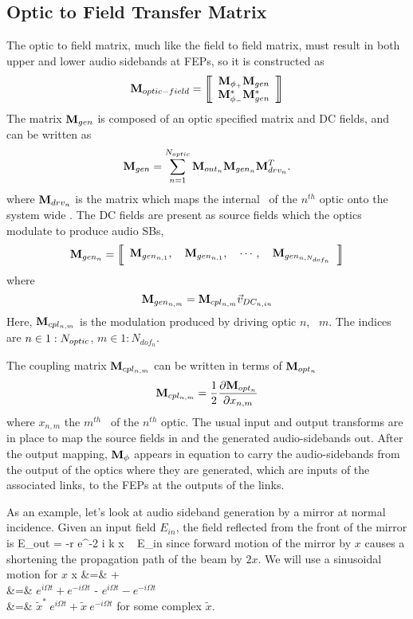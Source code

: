 \documentclass[12pt]{article}
\begin{document}
\subsection{Optic to Field Transfer Matrix}
The optic to field matrix, much like the field to field matrix, must result in both upper and lower audio sidebands at FEPs, so it is constructed as
\begin{equation}
\matm{optic-field} =
\matrixBegin{c}
 \mPhin{+} \mGen \\
 \mPhin{-}^* \mGen^* \\
\matrixEnd
\elabel{mOF}
\end{equation}
The matrix $\mathbf{M}_{gen}$ is composed of an optic specified matrix and DC fields, and can be written as
\begin{equation}
\mathbf{M}_{gen} = \sum_{n=1}^{N_{optic}} {\mathbf{M}_{out_{n}} \mathbf{M}_{gen_{n}} \mathbf{M}_{drv_{n}}^{T}}.
\end{equation}
where $\mathbf{M}_{drv_{n}}$ is the matrix which maps the internal \dsf\ of the $n^{th}$ optic onto the system wide \dsf. The DC fields are present as source fields which the optics modulate to produce audio SBs,
\begin{equation}
\mGenn{n} = \matrixBegin{c}
\mGenn{n,1} , ~~~
\mGenn{n,1} , ~~~
\cdots , ~~~
\mGenn{n,N_{dof_n}}
\matrixEnd \elabel{mGen}
\end{equation}
where
\begin{equation}
\mathbf{M}_{gen_{n,m}} = \mathbf{M}_{cpl_{n,m}} \vec{v}_{DC_{n,in}}
\end{equation}
Here, $\mathbf{M}_{cpl_{n,m}}$ is the modulation produced by driving optic $n$, \dof\ $m$.
The indices are $n \in 1:N_{optic}$, $m \in 1:N_{dof_n}$.

The coupling matrix $\mathbf{M}_{cpl_{n,m}}$ can be written in terms of $\mathbf{M}_{opt_{n}}$
\begin{equation}
\mCpln{n,m} = \frac{1}{2} \partderiv{\mOptn{n}}{x_{n,m}}
\elabel{mDrv}
\end{equation}
where $x_{n,m}$ the $m^{th}$ \dof\ of the $n^{th}$ optic. The usual input and output transforms are in place to map the source fields in and the generated audio-sidebands out.
After the output mapping, $\mathbf{M}_{\phi}$ appears in equation  to carry the audio-sidebands from the output of the optics where they are generated, which are inputs of the associated links, to the FEPs at the outputs of the links.

As an example, let's look at audio sideband generation by a mirror at normal incidence.
Given an input field $E_{in}$, the field reflected from the front of the mirror is
E_{out} = -r e^{-2 i k x} ~ E_{in}
\eeq
 since forward motion of the mirror by $x$ causes a shortening the propagation path of the beam by $2 x$.
We will use a sinusoidal motion for $x$
x &=&   +   \\
  &=& \half {} \(e^{i \Omega t} + e^{-i \Omega t} \) -   \(e^{i \Omega t} - e^{-i \Omega t} \) \\
  &=& \half \( \tilde{x}^* ~ e^{i \Omega t} + \tilde{x} ~ e^{-i \Omega t} \)
\eeqa
 for some complex $\tilde{x}$.
\end{document}
